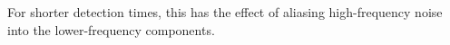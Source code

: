 For shorter detection times, this has the effect of aliasing
high-frequency noise into the lower-frequency components.  
